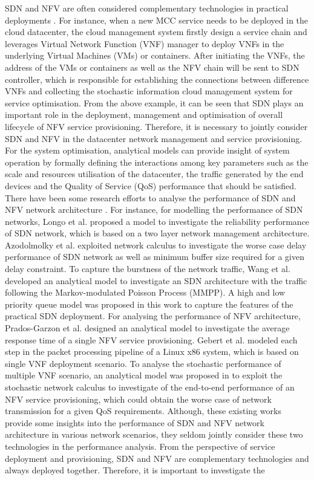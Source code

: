 SDN and NFV are often considered complementary technologies in practical deployments \cite{MatiasGTUJ15}.  For instance, when a new MCC service needs to be deployed in the cloud datacenter, the cloud management system firstly design a service chain and leverages Virtual Network Function (VNF) manager to deploy VNFs in the underlying Virtual Machines (VMs) or containers. After initiating the VNFs, the address of the VMs or containers as well as the NFV chain will be sent to SDN controller, which is responsible for establishing the connections between difference VNFs and collecting the stochastic information cloud management system for service optimisation. From the above example, it can be seen that SDN plays an important role in the deployment, management and optimisation of overall lifecycle of NFV service provisioning. Therefore, it is necessary to jointly consider SDN and NFV in the datacenter network management and service provisioning. For the system optimisation, analytical models can provide insight of system operation by formally defining the interactions among key parameters such as the scale and resources utilisation of the datacenter, the traffic generated by the end devices and the Quality of Service (QoS) performance that should be satisfied. There have been some research efforts to analyse the performance of SDN and NFV network architecture \cite{LongoDBS15} \cite{MiaoMWWH16} \cite{Prados-GarzonAR17} \cite{GebertZLST16} \cite{8624508}. For instance, for modelling the performance of SDN networks, Longo et al. \cite{LongoDBS15} proposed a model to investigate the reliability performance of SDN network, which is based on a two layer network management architecture. Azodolmolky et al. \cite{AzodolmolkyWY13} exploited network calculus to investigate the  worse case delay performance of SDN network as well as minimum buffer size required for a given delay constraint. To capture the burstness of the network traffic, Wang et al. \cite{MiaoMWWH16} developed an analytical model to investigate an SDN architecture with the traffic following the Markov-modulated Poisson Process (MMPP). A high and low priority queue model was proposed in this work to capture the features of the practical SDN deployment. For analysing the performance of NFV architecture, Prados-Garzon et al. \cite{Prados-GarzonAR17} designed an analytical model to investigate the average response time of a single NFV service provisioning. Gebert et al. \cite{GebertZLST16} modeled each step in the packet processing pipeline of a Linux x86 system, which is based on single VNF deployment scenario. To analyse the stochastic performance of multiple VNF scenario, an analytical model was proposed in \cite{8624508} to exploit the stochastic network calculus to investigate of the end-to-end performance of an NFV service provisioning, which could obtain the worse case of network transmission for a given QoS requirements. Although, these existing works provide some insights into the performance of SDN and NFV network architecture in various network scenarios, they seldom jointly consider these two technologies in the performance analysis. From the perspective of service deployment and provisioning, SDN and NFV are complementary technologies and always deployed together. Therefore, it is important to investigate the 